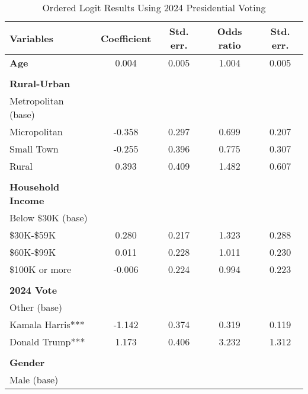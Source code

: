 \begin{table}[H]
\centering
\caption{Ordered Logit Results Using 2024 Presidential Voting}
\label{tab:ologit-vote}
\begin{tabular}{lcccc}
\toprule
\textbf{Variables} & \textbf{Coefficient} & \textbf{Std. err.} & \textbf{Odds ratio} & \textbf{Std. err.} \\ \midrule
\textbf{Age}              & 0.004  & 0.005 & 1.004  & 0.005    \\
                          &        &       &        &          \\
\textbf{Rural-Urban}      &        &       &        &          \\
Metropolitan (base)       &        &       &        &          \\
Micropolitan              & -0.358 & 0.297 & 0.699  & 0.207    \\
Small Town                & -0.255 & 0.396 & 0.775  & 0.307    \\
Rural                     & 0.393  & 0.409 & 1.482  & 0.607    \\
                          &        &       &        &          \\
\textbf{Household Income} &        &       &        &          \\
Below \$30K (base)        &        &       &        &          \\
\$30K-\$59K                 & 0.280  & 0.217 & 1.323  & 0.288    \\
\$60K-\$99K                 & 0.011  & 0.228 & 1.011  & 0.230    \\
\$100K or more            & -0.006 & 0.224 & 0.994  & 0.223    \\
                          &        &       &        &          \\
\textbf{2024 Vote}        &        &       &        &          \\
Other (base)              &        &       &        &          \\
Kamala Harris***          & -1.142 & 0.374 & 0.319  & 0.119    \\
Donald Trump***           & 1.173  & 0.406 & 3.232  & 1.312    \\
                          &        &       &        &          \\
\textbf{Gender}           &        &       &        &          \\
Male (base)               &        &       &        &          \\

\end{tabular}
\end{table}
